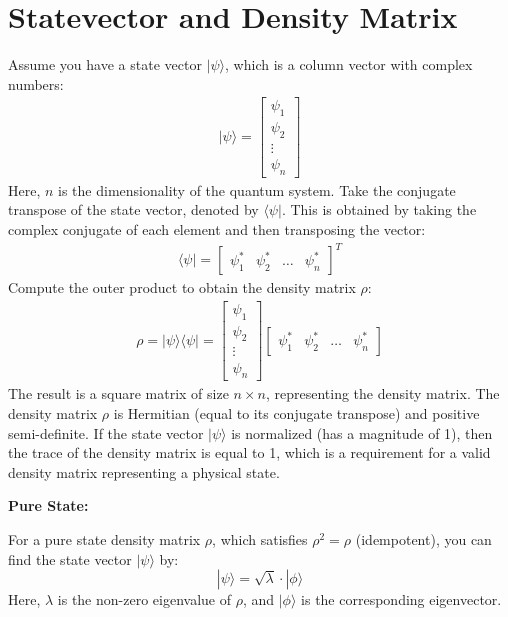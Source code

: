 \documentclass{article}
\begin{document}
\section{Statevector and Density Matrix} %
\label{sec:Statevector and Density Matrix}
Assume you have a state vector $|\psi\rangle$, which is a column vector with complex numbers:
\[
	\begin{aligned}
		|\psi\rangle = \begin{bmatrix} \psi_1 \\ \psi_2 \\ \vdots \\ \psi_n \end{bmatrix}
	\end{aligned}
\]
Here, $n$ is the dimensionality of the quantum system.
Take the conjugate transpose of the state vector, denoted by $\langle \psi|$. This is obtained by taking the complex conjugate of each element and then transposing the vector:
\[
	\begin{aligned}
		\langle \psi| = \begin{bmatrix} \psi_1^* & \psi_2^* & \ldots & \psi_n^* \end{bmatrix}^T
	\end{aligned}
\]
Compute the outer product to obtain the density matrix $\rho$:
\[
	\begin{aligned}
		\rho = |\psi\rangle \langle \psi| = \begin{bmatrix} \psi_1 \\ \psi_2 \\ \vdots \\ \psi_n \end{bmatrix} \begin{bmatrix} \psi_1^* & \psi_2^* & \ldots & \psi_n^* \end{bmatrix}
	\end{aligned}
\]
The result is a square matrix of size $n \times n$, representing the density matrix.
The density matrix $\rho$ is Hermitian (equal to its conjugate transpose) and positive semi-definite. If the state vector $|\psi\rangle$ is normalized (has a magnitude of 1), then the trace of the density matrix is equal to 1, which is a requirement for a valid density matrix representing a physical state.


\textbf{Pure State:}

For a pure state density matrix $\rho$, which satisfies $\rho^2 = \rho$ (idempotent), you can find the state vector $|\psi\rangle$ by:
\[ |\psi\rangle = \sqrt{\lambda} \cdot |\phi\rangle \]
Here, $\lambda$ is the non-zero eigenvalue of $\rho$, and $|\phi\rangle$ is the corresponding eigenvector.
\end{document}
